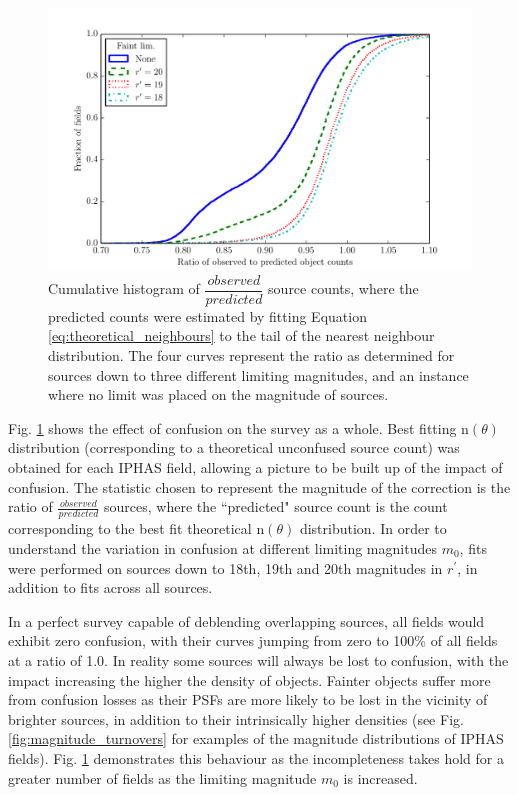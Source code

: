 \documentclass[a4paper,useAMS,usenatbib]{mn2e}
\begin{document}
\begin{figure}
\begin{center}
\includegraphics[width=1\linewidth]{figures/confusion_completeness.pdf} 
\caption{\footnotesize Cumulative histogram of $\dfrac{observed}{predicted}$ 
source counts, where the predicted counts were estimated by fitting Equation 
\ref{eq:theoretical_neighbours} to the tail of the nearest neighbour 
distribution. The four curves represent the ratio as determined for sources 
down to three different limiting magnitudes, and an instance where no limit 
was placed on the magnitude of sources.}
\label{fig:confusion_completeness}
\end{center}
\end{figure}

Fig. \ref{fig:confusion_completeness} shows the effect of confusion on the
survey as a whole. Best fitting n$(\theta)$ distribution (corresponding to a
theoretical unconfused source count) was obtained for each IPHAS field, allowing a picture to be built up of the impact of confusion. The statistic chosen to represent the magnitude of the correction is the ratio of $\frac{observed}{predicted}$ sources, where the ``predicted" source count is the count corresponding to the best fit theoretical n$(\theta)$ distribution. In order to understand the variation in confusion at different limiting magnitudes $m_0$, fits were performed on sources down to 18th, 19th and 20th magnitudes in $r^{\prime}$, in addition to fits across all sources.

In a perfect survey capable of deblending overlapping sources, all fields would
exhibit zero confusion, with their curves jumping from zero to 100\% of all
fields at a ratio of 1.0. In reality some sources will always be lost to
confusion, with the impact increasing the higher the density of objects. Fainter objects suffer more from confusion losses as their PSFs are more likely to be lost in the vicinity of brighter sources, in addition to their intrinsically higher densities (see Fig. \ref{fig:magnitude_turnovers} for examples of the magnitude distributions of IPHAS fields). Fig. \ref{fig:confusion_completeness} demonstrates this behaviour as the incompleteness takes hold for a greater number of fields as the limiting magnitude $m_0$ is increased.
\end{document}
